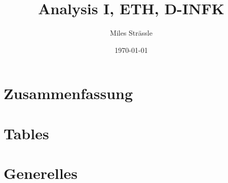\documentclass[11pt]{article}
\begin{document}
	
\setcounter{page}{1}
\setcounter{tocdepth}{2}

\title{Analysis I, ETH, D-INFK}
\author{Miles Strässle}
\date{\today}
\maketitle


% 



\part{Zusammenfassung}




%




\part{Tables}


%
%

\part{Generelles}



\end{document}
